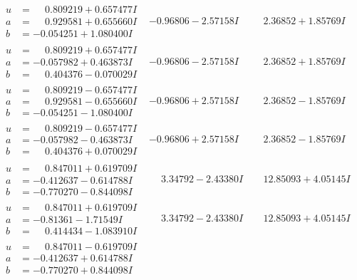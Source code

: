 \documentclass[1p]{elsarticle_modified}
\theoremstyle{definition}
\begin{document}
$$\begin{array}{c|c|c}
\begin{aligned}
u &= \phantom{-}0.809219 + 0.657477 I \\
a &= \phantom{-}0.929581 + 0.655660 I \\
b &= -0.054251 + 1.080400 I\end{aligned}
 & -0.96806 - 2.57158 I & \phantom{-}2.36852 + 1.85769 I \\ \hline\begin{aligned}
u &= \phantom{-}0.809219 + 0.657477 I \\
a &= -0.057982 + 0.463873 I \\
b &= \phantom{-}0.404376 - 0.070029 I\end{aligned}
 & -0.96806 - 2.57158 I & \phantom{-}2.36852 + 1.85769 I \\ \hline\begin{aligned}
u &= \phantom{-}0.809219 - 0.657477 I \\
a &= \phantom{-}0.929581 - 0.655660 I \\
b &= -0.054251 - 1.080400 I\end{aligned}
 & -0.96806 + 2.57158 I & \phantom{-}2.36852 - 1.85769 I \\ \hline\begin{aligned}
u &= \phantom{-}0.809219 - 0.657477 I \\
a &= -0.057982 - 0.463873 I \\
b &= \phantom{-}0.404376 + 0.070029 I\end{aligned}
 & -0.96806 + 2.57158 I & \phantom{-}2.36852 - 1.85769 I \\ \hline\begin{aligned}
u &= \phantom{-}0.847011 + 0.619709 I \\
a &= -0.412637 - 0.614788 I \\
b &= -0.770270 - 0.844098 I\end{aligned}
 & \phantom{-}3.34792 - 2.43380 I & \phantom{-}12.85093 + 4.05145 I \\ \hline\begin{aligned}
u &= \phantom{-}0.847011 + 0.619709 I \\
a &= -0.81361 - 1.71549 I \\
b &= \phantom{-}0.414434 - 1.083910 I\end{aligned}
 & \phantom{-}3.34792 - 2.43380 I & \phantom{-}12.85093 + 4.05145 I \\ \hline\begin{aligned}
u &= \phantom{-}0.847011 - 0.619709 I \\
a &= -0.412637 + 0.614788 I \\
b &= -0.770270 + 0.844098 I\end{aligned}

\end{array}$$
\end{document}
